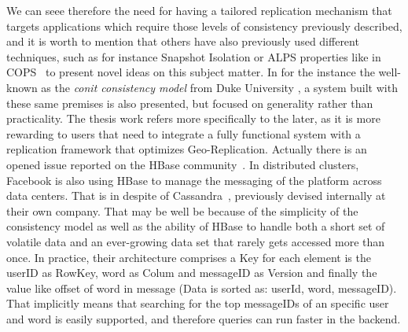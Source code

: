 We can seee therefore the need for having a tailored replication mechanism that targets applications which require those levels of consistency previously described, and it is worth to mention that others have also previously used different techniques, such as for instance Snapshot Isolation or ALPS properties like in COPS~\cite{Lloyd:2011} to present novel ideas on this subject matter. In for the instance the well-known as the \emph{conit consistency model} from Duke University \cite{Duke:2001}, a system built with these same premises is also presented, but focused on generality rather than practicality. The thesis work refers more specifically to the later, as it is more rewarding to users that need to integrate a fully functional system with a replication framework that optimizes Geo-Replication. Actually there is an opened issue reported on the HBase community~\cite{JIRA-1}. In distributed clusters, Facebook is also using HBase to manage the messaging of the platform across data centers. That is in despite of Cassandra~\cite{FacebookHBase}, previously devised internally at their own company. That may be well be because of the simplicity of the consistency model as well as the ability of HBase to handle both a short set of volatile data and an ever-growing data set that rarely gets accessed more than once. In practice, their architecture comprises a Key for each element is the userID as RowKey, word as Colum and messageID as Version and finally the value like offset of word in message (Data is sorted as: userId, word, messageID). That implicitly means that searching for the top messageIDs of an specific user and word is easily supported, and therefore queries can run faster in the backend.


